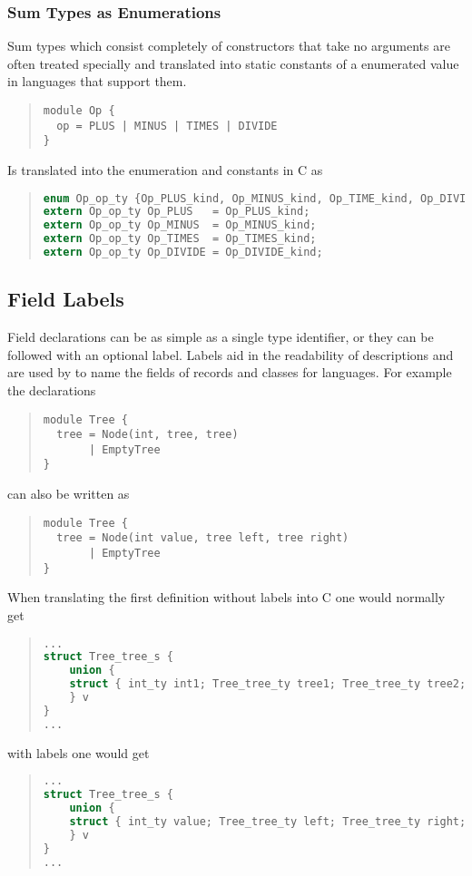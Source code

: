 \subsubsection{Sum Types as Enumerations}
\label{sec:enumerations}

Sum types which consist completely of constructors that take no arguments
are often treated specially and translated into static constants of a
enumerated value in languages that support them.
\begin{quote}\begin{lstlisting}[language=ASDL]
module Op {
  op = PLUS | MINUS | TIMES | DIVIDE 
}
\end{lstlisting}\end{quote}%

Is translated into the enumeration and constants in C as
\begin{quote}\begin{lstlisting}[language=c]
enum Op_op_ty {Op_PLUS_kind, Op_MINUS_kind, Op_TIME_kind, Op_DIVIDE_kind};
extern Op_op_ty Op_PLUS   = Op_PLUS_kind;
extern Op_op_ty Op_MINUS  = Op_MINUS_kind;
extern Op_op_ty Op_TIMES  = Op_TIMES_kind;
extern Op_op_ty Op_DIVIDE = Op_DIVIDE_kind;
\end{lstlisting}\end{quote}%

\subsection{Field Labels}
Field declarations can be as simple as a single type identifier, or they can
be followed with an optional label. Labels aid in the readability of
descriptions and are used by \asdlgen{} to name the fields of records
and classes for languages. For example the declarations
\begin{quote}\begin{lstlisting}[language=ASDL]
module Tree {
  tree = Node(int, tree, tree)
       | EmptyTree
}
\end{lstlisting}\end{quote}%
can also be written as
\begin{quote}\begin{lstlisting}[language=ASDL]
module Tree {
  tree = Node(int value, tree left, tree right)
       | EmptyTree
}
\end{lstlisting}\end{quote}%

When translating the first definition without labels 
into C one would normally get
\begin{quote}\begin{lstlisting}[language=c]
...
struct Tree_tree_s {
    union {
    struct { int_ty int1; Tree_tree_ty tree1; Tree_tree_ty tree2; } ...
    } v
}
...
\end{lstlisting}\end{quote}%
with labels one would get
\begin{quote}\begin{lstlisting}[language=c]
...
struct Tree_tree_s {
    union {
    struct { int_ty value; Tree_tree_ty left; Tree_tree_ty right; } ...
    } v
}
...
\end{lstlisting}\end{quote}%

